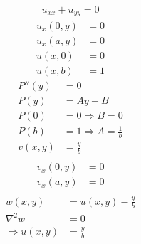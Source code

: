 \documentclass[../../HW08.tex]{subfiles}
\begin{document}
\begin{gather*}
    u_{xx} + u_{yy}=0
\end{gather*}
\begin{align*}
    u_{x}(0,y) & = 0 \\
    u_{x}(a,y) & = 0 \\
    u(x,0)     & = 0 \\
    u(x,b)     & = 1
\end{align*}
\begin{align*}
    P''(y) & = 0                             \\
    P(y)   & = Ay + B                        \\
    P(0)   & = 0 \Rightarrow B = 0           \\
    P(b)   & = 1 \Rightarrow A = \frac{1}{b} \\
    v(x,y) & = \frac{y}{b}                   \\
\end{align*}
\begin{align*}
    v_{x}(0,y) & = 0 \\
    v_{x}(a,y) & = 0   \\
\end{align*}
\begin{align*}
    w(x,y)             & = u(x,y) - \frac{y}{b} \\
    \nabla^{2}w        & = 0                    \\
    \Rightarrow u(x,y) & = \frac{y}{b}
\end{align*}
\end{document}
